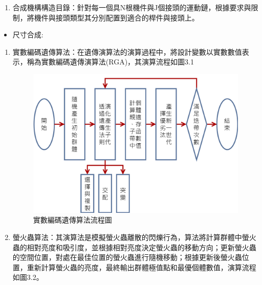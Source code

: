 \documentclass[14pt,a4paper]{report}  %
\newcommand{\fourteen}{\fontsize{14pt}{\baselineskip}\selectfont}%
\begin{document}
{\begin{enumerate}
      \begin{equation}
      F_{s}=6\left ( N-1 \right )-\sum J_{i}C_{si}
      \end{equation}  
      \item 合成機構構造目錄：針對每一個具N根機件與J個接頭的運動鏈，根據要求與限制，將機件與接頭類型其分別配置到適合的桿件與接頭上。
      \hspace*{\fill} \\
      \end{enumerate}
      \begin{itemize} 
      \item 尺寸合成:
      \end{itemize} 
      \fourteen {通過隨機變量生成具有路徑限制的機構，生成結構參數來自變數設定，也有其它算法選擇，程式內共包含三種算法：實數編碼遺傳算法、螢火蟲算法與差分進化演算法。}
      \begin{enumerate}
      \item {實數編碼遺傳算法：在遺傳演算法的演算過程中，將設計變數以實數數值表示，稱為實數編碼遺傳演算法(RGA)，其演算流程如圖3.1}
      \begin{figure}[hbt!]
        \centering
        \includegraphics[scale=0.3]{實數編碼遺傳算法.png} 
        \caption{實數編碼遺傳算法流程圖}
        \label{fig:scale}
        \end{figure}
        
       \item {螢火蟲算法：其演算法是模擬螢火蟲離散的閃爍行為，算法將計算群體中螢火蟲的相對亮度和吸引度，並根據相對亮度決定螢火蟲的移動方向；更新螢火蟲的空間位置，對處在最佳位置的螢火蟲進行隨機移動；根據更新後螢火蟲位置，重新計算螢火蟲的亮度，最終輸出群體極值點和最優個體數值，演算流程如圖3.2。}
       

\end{enumerate}}
\end{document}

